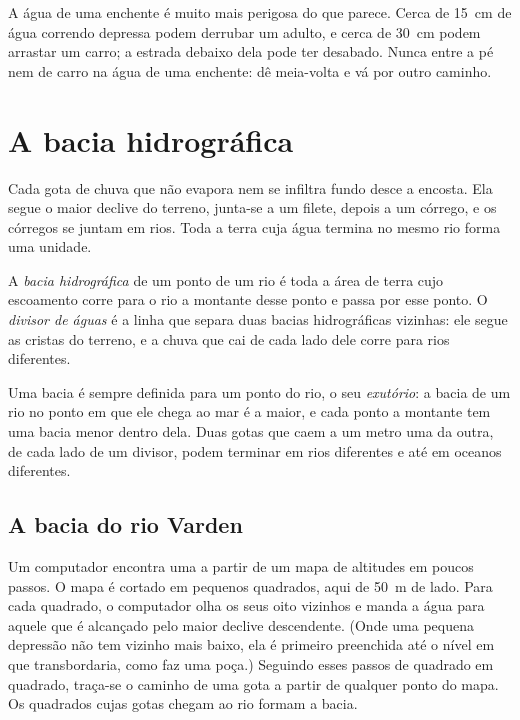 \begin{safety}
A água de uma enchente é muito mais perigosa do que parece. Cerca de
\qty{15}{cm} de água correndo depressa podem derrubar um adulto, e cerca de
\qty{30}{cm} podem arrastar um carro; a estrada debaixo dela pode ter
desabado. Nunca entre a pé nem de carro na água de uma enchente: dê meia-volta
e vá por outro caminho.
\end{safety}

\section{A bacia hidrográfica}

Cada gota de chuva que não evapora nem se infiltra fundo desce a encosta.
Ela segue o maior declive do terreno, junta-se a um filete, depois a um
córrego, e os córregos se juntam em rios. Toda a terra cuja água termina no
mesmo rio forma uma unidade.

\begin{definition}\label{def:g10:drainage-basins:drainage-basin}
A \emph{bacia hidrográfica} de
um ponto de um rio é toda a área de terra cujo escoamento corre para o rio a
montante desse ponto e passa por esse ponto. O \emph{divisor de
águas} é a linha que separa duas
bacias hidrográficas vizinhas: ele segue as cristas do terreno, e a chuva
que cai de cada lado dele corre para rios diferentes.
\end{definition}

Uma bacia é sempre definida para um ponto do rio, o seu \emph{exutório}: a
bacia de um rio no ponto em que ele chega ao mar é a maior, e cada ponto a
montante tem uma bacia menor dentro dela. Duas gotas que caem a um metro uma
da outra, de cada lado de um divisor, podem terminar em rios diferentes e
até em oceanos diferentes.

\subsection*{A bacia do rio Varden}

Um computador encontra uma  a partir de um mapa de
altitudes em poucos passos. O mapa é cortado em pequenos quadrados, aqui de
\qty{50}{m} de lado. Para cada quadrado, o computador olha os seus oito
vizinhos e manda a água para aquele que é alcançado pelo maior declive
descendente. (Onde uma pequena depressão não tem vizinho mais baixo, ela é
primeiro preenchida até o nível em que transbordaria, como faz uma poça.)
Seguindo esses passos de quadrado em quadrado, traça-se o caminho de uma
gota a partir de qualquer ponto do mapa. Os quadrados cujas gotas chegam ao
rio formam a bacia.

